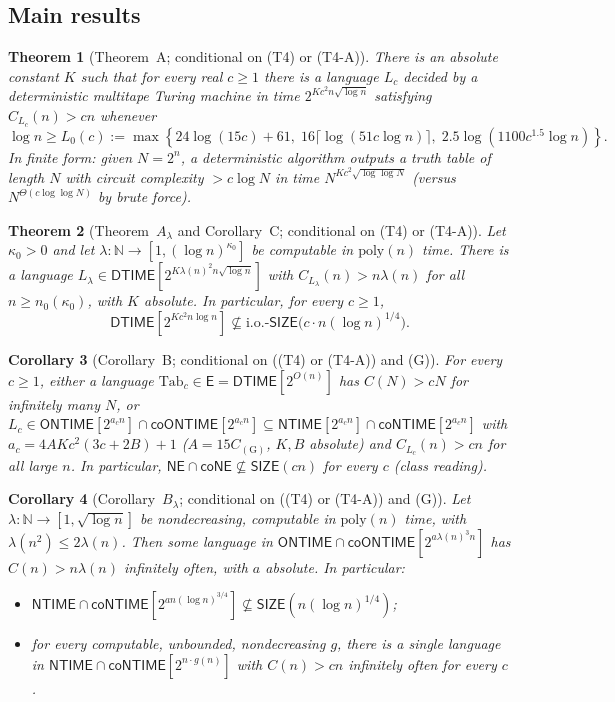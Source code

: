 \documentclass[11pt]{article}
\newtheorem{theorem}{Theorem}
\newtheorem{corollary}[theorem]{Corollary}
\theoremstyle{definition}
\newcommand{\DTIME}{\mathsf{DTIME}}
\newcommand{\NTIME}{\mathsf{NTIME}}
\newcommand{\ONTIME}{\mathsf{ONTIME}}
\newcommand{\SIZE}{\mathsf{SIZE}}
\newcommand{\NE}{\mathsf{NE}}
\newcommand{\coNE}{\mathsf{coNE}}
\newcommand{\E}{\mathsf{E}}
\begin{document}
\subsection{Main results}

\begin{theorem}[Theorem~A; conditional on (T4) or (T4-A)]\label{thm:A}
There is an absolute constant $K$ such that for every real $c\ge1$ there is a language $L_c$ decided by a deterministic multitape Turing machine in time $2^{K c^2 n\sqrt{\log n}}$ satisfying $C_{L_c}(n)>cn$ whenever
\[
\log n \ge L_0(c) := \max\!\left\{24\log(15c)+61,\; 16\lceil\log(51c\log n)\rceil,\; 2.5\log(1100 c^{1.5}\log n)\right\}.
\]
In finite form: given $N=2^n$, a deterministic algorithm outputs a truth table of length $N$ with circuit complexity $>c\log N$ in time $N^{K c^2\sqrt{\log\log N}}$ (versus $N^{\Theta(c\log\log N)}$ by brute force).
\end{theorem}

\begin{theorem}[Theorem~$A_\lambda$ and Corollary~C; conditional on (T4) or (T4-A)]\label{thm:Alambda}
Let $\kappa_0>0$ and let $\lambda:\mathbb{N}\to[1,(\log n)^{\kappa_0}]$ be computable in $\mathrm{poly}(n)$ time. There is a language $L_\lambda\in\DTIME[2^{K\lambda(n)^2 n\sqrt{\log n}}]$ with $C_{L_\lambda}(n)>n\lambda(n)$ for all $n\ge n_0(\kappa_0)$, with $K$ absolute. In particular, for every $c\ge1$,
\[
\DTIME[2^{K c^2 n\log n}] \not\subseteq \mathrm{i.o.}\text{-}\SIZE\!\bigl(c\cdot n(\log n)^{1/4}\bigr).
\]
\end{theorem}

\begin{corollary}[Corollary~B; conditional on ((T4) or (T4-A)) and (G)]\label{cor:B}
For every $c\ge1$, either a language $\mathrm{Tab}_c\in\E=\DTIME[2^{O(n)}]$ has $C(N)>cN$ for infinitely many $N$, or $L_c\in\ONTIME[2^{a_c n}]\cap\mathsf{coONTIME}[2^{a_c n}]\subseteq\NTIME[2^{a_c n}]\cap\mathsf{coNTIME}[2^{a_c n}]$ with $a_c=4AKc^2(3c+2B)+1$ ($A=15C_{(\mathrm{G})}$, $K,B$ absolute) and $C_{L_c}(n)>cn$ for all large $n$. In particular, $\NE\cap\coNE\not\subseteq\SIZE(cn)$ for every $c$ (class reading).
\end{corollary}

\begin{corollary}[Corollary~$B_\lambda$; conditional on ((T4) or (T4-A)) and (G)]\label{cor:Blambda}
Let $\lambda:\mathbb{N}\to[1,\sqrt{\log n}]$ be nondecreasing, computable in $\mathrm{poly}(n)$ time, with $\lambda(n^2)\le2\lambda(n)$. Then some language in $\ONTIME\cap\mathsf{coONTIME}[2^{a\lambda(n)^3 n}]$ has $C(n)>n\lambda(n)$ infinitely often, with $a$ absolute. In particular:
\begin{itemize}
\item $\NTIME\cap\mathsf{coNTIME}[2^{an(\log n)^{3/4}}]\not\subseteq\SIZE(n(\log n)^{1/4})$;
\item for every computable, unbounded, nondecreasing $g$, there is a single language in $\NTIME\cap\mathsf{coNTIME}[2^{n\cdot g(n)}]$ with $C(n)>cn$ infinitely often for every $c$.
\end{itemize}
\end{corollary}
\end{document}
